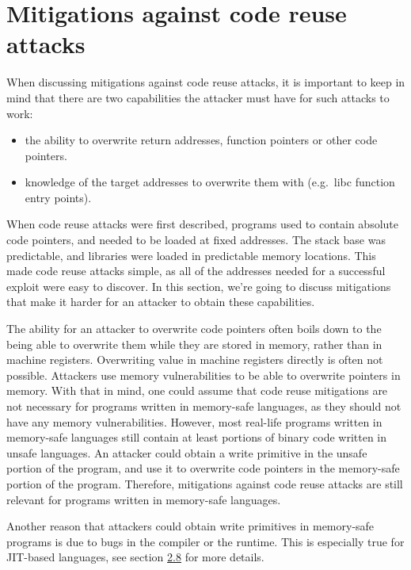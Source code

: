 \documentclass[
  a4paper,
]{report}
\providecommand{\tightlist}{%
  \setlength{\itemsep}{0pt}\setlength{\parskip}{0pt}}
\begin{document}
\section{Mitigations against code reuse
attacks}\label{mitigations-against-code-reuse-attacks}

When discussing mitigations against code reuse attacks, it is important
to keep in mind that there are two capabilities the attacker must have
for such attacks to work:

\begin{itemize}
\tightlist
\item
  the ability to overwrite return addresses, function pointers or other
  code pointers.
\item
  knowledge of the target addresses to overwrite them with (e.g.~libc
  function entry points).
\end{itemize}

When code reuse attacks were first described, programs used to contain
absolute code pointers, and needed to be loaded at fixed addresses. The
stack base was predictable, and libraries were loaded in predictable
memory locations. This made code reuse attacks simple, as all of the
addresses needed for a successful exploit were easy to discover. In this
section, we're going to discuss mitigations that make it harder for an
attacker to obtain these capabilities.

The ability for an attacker to overwrite code pointers often boils down
to the being able to overwrite them while they are stored in memory,
rather than in machine
\label{__index_entry_26}{registers}.
Overwriting value in machine registers directly is often not possible.
Attackers use \label{__index_entry_27}{memory
vulnerabilities} to be able to overwrite
pointers in memory. With that in mind, one could assume that code reuse
mitigations are not necessary for programs written in memory-safe
languages, as they should not have any memory vulnerabilities. However,
most real-life programs written in memory-safe languages still contain
at least portions of binary code written in unsafe languages. An
attacker could obtain a write primitive in the unsafe portion of the
program, and use it to overwrite code pointers in the memory-safe
portion of the program. Therefore, mitigations against code reuse
attacks are still relevant for programs written in memory-safe
languages.

Another reason that attackers could obtain write primitives in
memory-safe programs is due to bugs in the compiler or the runtime. This
is especially true for JIT-based languages, see section
\hyperref[sec:jit-compiler-vulnerabilities]{2.8} for more details.
\end{document}
